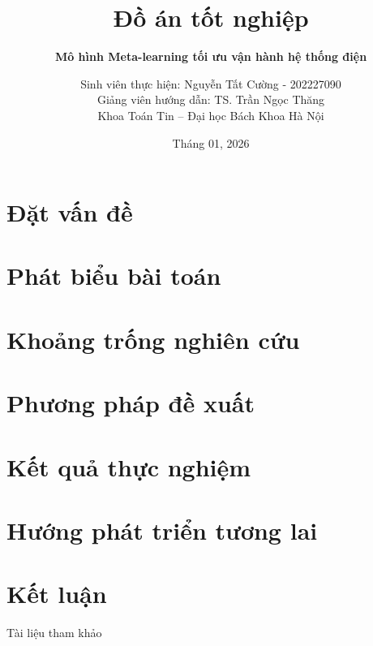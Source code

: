 \documentclass[aspectratio=169]{beamer}
\title{Đồ án tốt nghiệp}
\subtitle{\textbf{Mô hình Meta-learning tối ưu vận hành hệ thống điện}}
\author{Sinh viên thực hiện: Nguyễn Tất Cường - 202227090\\Giảng viên hướng dẫn: TS. Trần Ngọc Thăng\\Khoa Toán Tin -- Đại học Bách Khoa Hà Nội}
\date{Tháng 01, 2026}
\begin{document}
\begin{frame}
	\maketitle
\end{frame}

\section{Đặt vấn đề}


\section{Phát biểu bài toán}


\section{Khoảng trống nghiên cứu}


\section{Phương pháp đề xuất}


\section{Kết quả thực nghiệm}


\section{Hướng phát triển tương lai}


\section{Kết luận}



\begin{frame}{Tài liệu tham khảo}
    \nocite{vincent2008, goodfellow2014, kingma2018, shannon1948}
    
    
\end{frame}

\begin{frame}{~}
    \centering
    \Large \color{hustred}{Cảm ơn Thầy Cô và các bạn đã chú ý lắng nghe!}
\end{frame}
\end{document}
